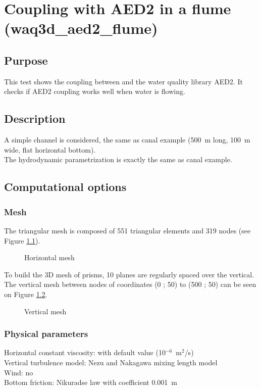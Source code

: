 \chapter{Coupling  with AED2 in a flume (waq3d\_aed2\_flume)}
%
%
\section{Purpose}
%
This test shows the coupling between  and the water quality library
AED2.
It checks if AED2 coupling works well when water is flowing.
%
\section{Description}
%
A simple channel is considered, the same as canal example (500~m long,
100~m wide, flat horizontal bottom).\\
The hydrodynamic parametrization is exactly the same as canal example.
%
\section{Computational options}
%
\subsection{Mesh}
%
The triangular mesh is composed of 551 triangular elements and 319 nodes
(see Figure \ref{fig:waq3d_aed2_flume:mesh}).

\begin{figure}[H]
 \centering
  \caption{Horizontal mesh}\label{fig:waq3d_aed2_flume:mesh}
\end{figure}

To build the 3D mesh of prisms, 10 planes are regularly spaced over the vertical.
The vertical mesh between nodes of coordinates (0 ; 50) to (500 ; 50) can be seen
on Figure \ref{fig:waq3d_aed2_flume:mesh_section}.

\begin{figure}[H]
 \centering
  \caption{Vertical mesh}\label{fig:waq3d_aed2_flume:mesh_section}
\end{figure}
%
\subsection{Physical parameters}
%
Horizontal constant viscosity: with default value (10$^{-6}$~m$^2$/s)\\
Vertical turbulence model: Nezu and Nakagawa mixing length model\\
Wind: no\\
Bottom friction: Nikuradse law with coefficient 0.001~m
%
